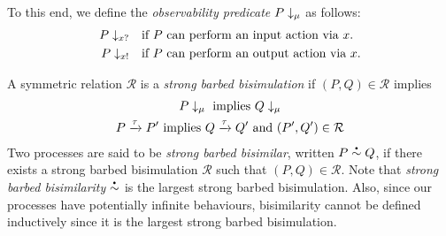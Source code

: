 To this end, we define the \emph{observability predicate}
\( P\downarrow_{\mu} \) as follows:
\begin{align*}
  P\downarrow_{x?}  &\quad \textrm{if \( P \) can perform an input action via \( x \).} \\
  P\downarrow_{x!} &\quad \textrm{if \( P \) can perform an output action via \( x \).}
\end{align*}

A symmetric relation $\mathcal R$ is a {\em strong barbed
  bisimulation} if $(P,Q)\in\mathcal R$ implies
\begin{gather}
  P\downarrow_{\mu}~\textrm{implies}~Q\downarrow_{\mu}\label{eq:bisim1} \\
  P \xrightarrow{\tau} P'~\textrm{implies}~Q \xrightarrow{\tau} Q'~\textrm{and}~
  (P',Q')\in\mathcal R\label{eq:bisim2}
\end{gather}
%
Two processes are said to be \emph{strong barbed bisimilar}, written
\( P\sbbisim{}{}Q \), if there exists a strong barbed bisimulation
$\mathcal R$ such that $(P,Q)\in\mathcal R$. Note that {\em strong
  barbed bisimilarity} \( \sbbisim{}{} \) is the largest strong barbed
bisimulation.
Also, since our processes have potentially infinite behaviours,
bisimilarity cannot be defined inductively since it is the largest
strong barbed bisimulation.

